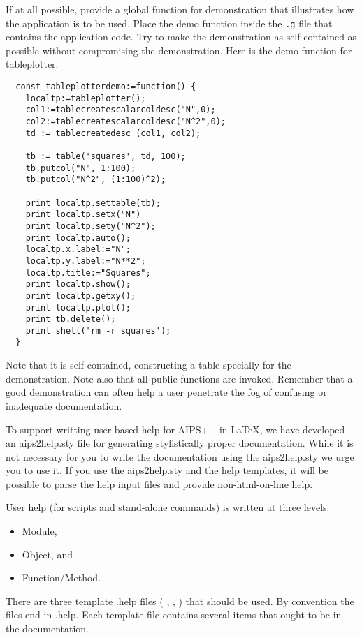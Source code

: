If at all possible, provide a global function for demonstration that
illustrates how the application is to be used. Place the demo function
inside the {\tt .g} file that contains the application code.  Try to
make the demonstration as self-contained as possible without
compromising the demonstration. Here is the demo function for
tableplotter:

\begin{verbatim}
  const tableplotterdemo:=function() {
    localtp:=tableplotter();
    col1:=tablecreatescalarcoldesc("N",0);
    col2:=tablecreatescalarcoldesc("N^2",0);
    td := tablecreatedesc (col1, col2);

    tb := table('squares', td, 100);
    tb.putcol("N", 1:100);
    tb.putcol("N^2", (1:100)^2);

    print localtp.settable(tb);
    print localtp.setx("N")
    print localtp.sety("N^2");
    print localtp.auto();
    localtp.x.label:="N";
    localtp.y.label:="N**2";
    localtp.title:="Squares";
    print localtp.show();
    print localtp.getxy();
    print localtp.plot();
    print tb.delete();
    print shell('rm -r squares');
  }
\end{verbatim}

Note that it is self-contained, constructing a table specially for
the demonstration. Note also that all public functions are invoked.
Remember that a good demonstration can often help a user penetrate
the fog of confusing or inadequate documentation.

\newcommand{\userrefman}{
\htmladdnormallink{"AIPS++ User Reference Manual"}{../../user/Refman/Refman.html}}
To support writting user based help for AIPS++ in LaTeX, 
we have developed an aips2help.sty file for generating stylistically proper
documentation.
While it is not necessary for you to write the documentation
using the aips2help.sty we urge you to use it.
If you use the aips2help.sty and the help templates, it will be possible to
parse the help input files and provide non-html-on-line help.

User help (for scripts and stand-alone commands) is written at
three levels:
\begin{itemize}
\item Module,
\item Object, and
\item Function/Method.
\end{itemize}
There are three template .help files (
, 
, 
)
 that should be used.  By convention
the files end in .help.  Each template file contains several items
that ought to be in the documentation.

